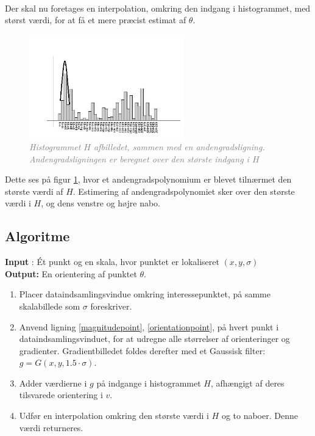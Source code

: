 \\
Der skal nu foretages en interpolation, omkring den indgang i histogrammet, med størst værdi, for at få et mere præcist estimat af $\theta$.
\begin{figure}[H]
    \centering
    \includegraphics[width=0.60\textwidth]{fig/sift-orientation-histogram.jpg}
     \vspace{-1em}
    \begin{center}    
       \caption{\textcolor{gray}{\footnotesize \textit{Histogrammet $H$ afbilledet, sammen med en andengradsligning. Andengradsligningen er beregnet over den største indgang i $H$}}}
    \label{histogramheight}
     \end{center}
     \vspace{-2.5em}
  \end{figure} \noindent
Dette ses på figur \ref{histogramheight}, hvor et andengradspolynomium er blevet tilnærmet den største værdi af $H$. Estimering af andengradspolynomiet sker over den største værdi i $H$, og dens venstre og højre nabo.
\subsection*{Algoritme}
\textbf{Input} : Ét punkt og en skala, hvor punktet er lokaliseret $(x,y,\sigma)$  \\
\textbf{Output:} En orientering af punktet $\theta$.  \\
\begin{enumerate}
\item Placer dataindsamlingsvindue omkring  interessepunktet, på samme skalabillede som $\sigma$ foreskriver.
\item Anvend ligning \eqref{magnitudepoint}, \eqref{orientationpoint}, på hvert punkt i dataindsamlingsvinduet, for at udregne alle størrelser af orienteringer og gradienter. Gradientbilledet foldes derefter med et Gaussisk filter: $g = G(x,y,1.5 \cdot \sigma)$.
\item Adder værdierne i $g$ på indgange i histogrammet $H$, afhængigt af deres tilsvarede orientering i $v$.
\item  Udfør en interpolation omkring den største værdi i $H$ og to naboer. Denne værdi returneres.
\end{enumerate}
